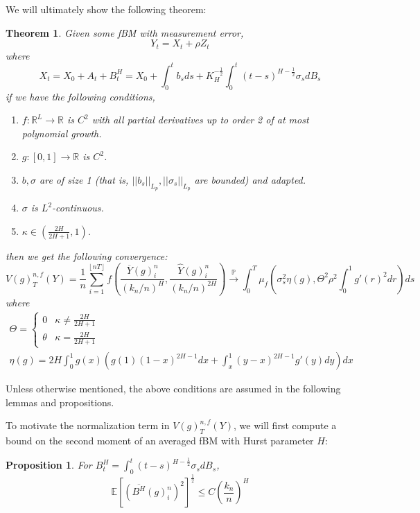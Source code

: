 \documentclass[12pt,letterpaper]{article}
\newtheorem{theorem}{Theorem}
\newtheorem{prop}{Proposition}
\theoremstyle{definition}
\newcommand{\R}{\mathbb{R}}
\newcommand{\E}{\mathbb{E}}
\begin{document}
We will ultimately show the following theorem:
\begin{theorem}
  Given some fBM with measurement error,
  \begin{equation}
    Y_t = X_t + \rho Z_t
  \end{equation}
  where
  \begin{equation}
    X_t = X_0 + A_t + B_t^H = X_0 + \int_0^tb_sds + K_H^{-\frac{1}{2}}\int_0^t(t-s)^{H - \frac{1}{2}}\sigma_sdB_s
  \end{equation}
  if we have the following conditions, %
  \begin{enumerate}
    \item \(f: \R^L \rightarrow \R\) is \(C^2\) with all partial derivatives up to order 2 of at most polynomial growth.
    \item \(g: [0,1] \rightarrow \R\) is \(C^2\).
    \item \(b, \sigma\) are of size 1 (that is, \(||b_s||_{L_p}, ||\sigma_s||_{L_p}\) are bounded) and adapted.
    \item \(\sigma\) is \(L^2\)-continuous.
    \item \(\kappa \in \left(\frac{2H}{2H+1}, 1\right)\).
  \end{enumerate}
  then we get the following convergence:
  \begin{equation}
    V(g)^{n,f}_T(Y) = \frac{1}{n}\sum_{i=1}^{\left\lfloor nT \right\rfloor}f\left( \frac{\overline{Y}(g)^n_i}{\left( k_n/n \right)^H}, \frac{\widehat{Y}(g)^n_i}{\left( k_n/n \right)^{2H}} \right) \overset{\mathbb{P}}{\rightarrow} \int_0^T \mu_f\left( \sigma_s^2\eta\left( g \right), \Theta^2\rho^2 \int_0^1g'(r)^2dr \right)ds
  \end{equation}
  where
  \begin{gather}
    \Theta =
    \begin{cases}
      0 & \kappa \neq \frac{2H}{2H+1} \\
      \theta &  \kappa = \frac{2H}{2H+1}
    \end{cases} \\
    \eta(g) = 2H\int_0^1g(x)\left(g(1)(1-x)^{2H-1}dx + \int_x^1(y-x)^{2H-1}g'(y)dy\right)dx
  \end{gather}
\end{theorem}
Unless otherwise mentioned, the above conditions are assumed in the following lemmas and propositions.

To motivate the normalization term in \(V(g)_T^{n,f}(Y)\), we will first compute a bound on the second moment of an averaged fBM with Hurst parameter \(H\):
\begin{prop}
  For \(B^H_t = \int_0^t(t-s)^{H - \frac{1}{2}}\sigma_sdB_s\),
  \begin{equation}
    \E\left[ \left(\overline{B^H}(g)^n_i\right)^2 \right]^{\frac{1}{2}} \leq C\left( \frac{k_n}{n} \right)^H
  \end{equation}
\end{prop}
\end{document}
